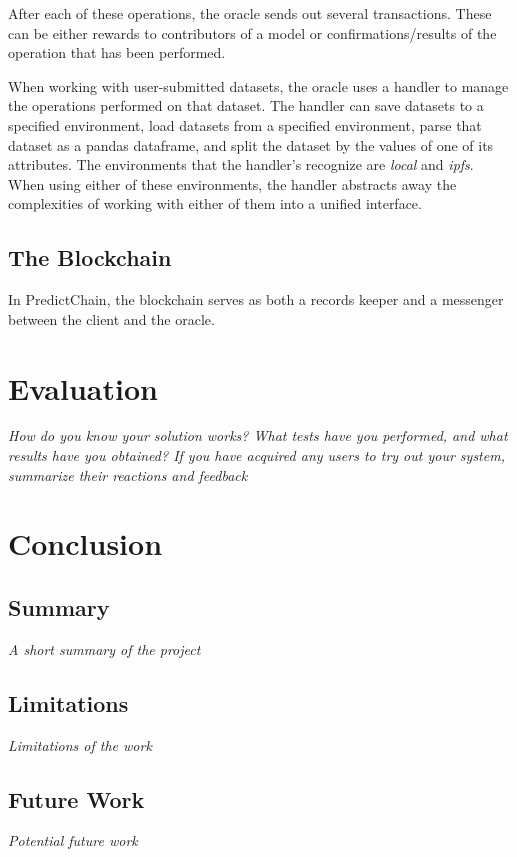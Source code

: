 \documentclass{article}
\begin{document}
After each of these operations, the oracle sends out several transactions.  These can be either rewards to contributors
of a model or confirmations/results of the operation that has been performed.

When working with user-submitted datasets, the oracle uses a handler to manage the operations performed on that dataset.
The handler can save datasets to a specified environment, load datasets from a specified environment, parse that dataset
as a pandas dataframe, and split the dataset by the values of one of its attributes.  The environments that the handler's
recognize are \textit{local} and \textit{ipfs}.  When using either of these environments, the handler abstracts away the
complexities of working with either of them into a unified interface.

\subsection{The Blockchain}

In PredictChain, the blockchain serves as both a records keeper and a messenger between the client and the oracle.

\section{Evaluation}

\emph{How do you know your solution works? What tests have you performed, and what results have you obtained?
If you have acquired any users to try out your system, summarize their reactions and feedback}

\section{Conclusion}

\subsection{Summary}
\emph{A short summary of the project}

\subsection{Limitations}
\emph{Limitations of the work}

\subsection{Future Work}
\emph{Potential future work}

\cite{test}


\end{document}
